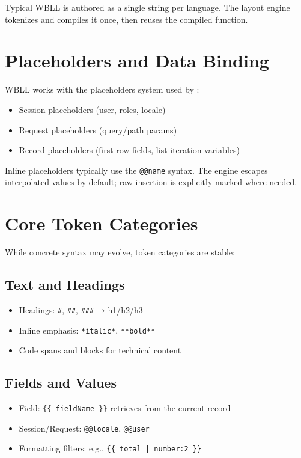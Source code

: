 Typical WBLL is authored as a single string per language. The layout engine tokenizes and compiles it once, then reuses the compiled function.

\section{Placeholders and Data Binding}
\label{sec:wbll-placeholders}

WBLL works with the placeholders system used by \wbpl{}:

\begin{itemize}
	\item Session placeholders (user, roles, locale)
	\item Request placeholders (query/path params)
	\item Record placeholders (first row fields, list iteration variables)
\end{itemize}

Inline placeholders typically use the \verb|@@name| syntax. The engine escapes interpolated values by default; raw insertion is explicitly marked where needed.

\section{Core Token Categories}
\label{sec:wbll-tokens}

While concrete syntax may evolve, token categories are stable:

\subsection{Text and Headings}
\begin{itemize}
	\item Headings: \verb|#|, \verb|##|, \verb|###| → h1/h2/h3
	\item Inline emphasis: \verb|*italic*|, \verb|**bold**|
	\item Code spans and blocks for technical content
\end{itemize}

\subsection{Fields and Values}
\begin{itemize}
	\item Field: \verb|{{ fieldName }}| retrieves from the current record
	\item Session/Request: \verb|@@locale|, \verb|@@user|
	\item Formatting filters: e.g., \verb+{{ total | number:2 }}+
\end{itemize}

